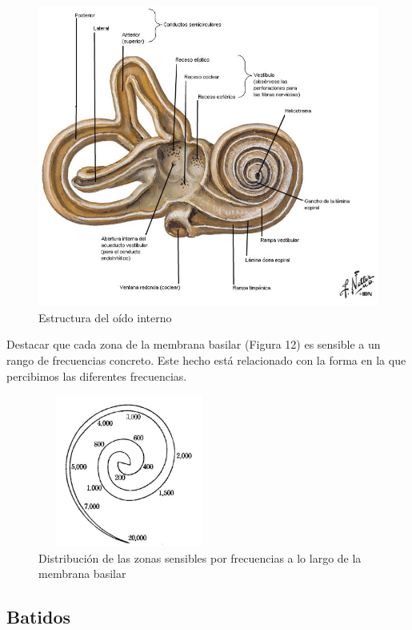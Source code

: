 \documentclass[11pt,a4paper]{article}
\begin{document}
	\begin{figure}[h]
		\centering
		\includegraphics[scale=.5]{OInterno.jpg}
		\caption{Estructura del oído interno}
	\end{figure}
	
	Destacar que cada zona de la membrana basilar (Figura 12) es sensible a un rango de frecuencias concreto. Este hecho está relacionado con la forma en la que percibimos las diferentes frecuencias.
	
		\begin{figure}
			\centering
				\includegraphics[height=50mm, width = 60mm]{RespFreqMemBasilar.jpg}
				\caption{Distribución de las zonas sensibles por frecuencias a lo largo de la membrana basilar}
		\end{figure}
		
	\subsection{Batidos}
	
\end{document}
